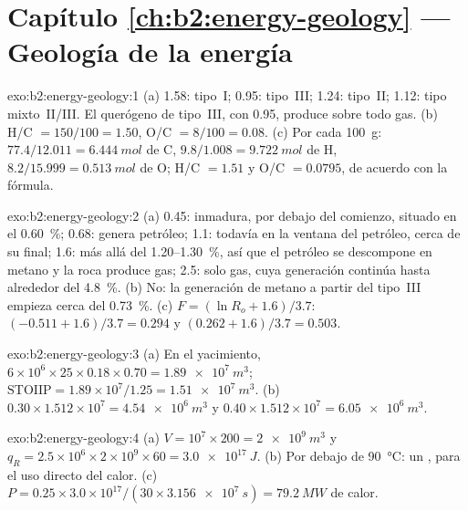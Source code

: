 \section*{Capítulo \ref{ch:b2:energy-geology} --- Geología de la energía}

\begin{solution}{exo:b2:energy-geology:1}
(a) 1.58: tipo~I; 0.95: tipo~III; 1.24: tipo~II; 1.12: tipo mixto~II/III. El querógeno de tipo~III, con
0.95, produce sobre todo gas. (b) H/C $= 150/100 = 1.50$, O/C $= 8/100 = 0.08$. (c) Por cada \qty{100}{g}:
$77.4/12.011 = \qty{6.444}{mol}$ de C, $9.8/1.008 = \qty{9.722}{mol}$ de H, $8.2/15.999 =
\qty{0.513}{mol}$ de O; H/C $= 1.51$ y O/C $= 0.0795$, de acuerdo con la fórmula.
\end{solution}

\begin{solution}{exo:b2:energy-geology:2}
(a) 0.45: inmadura, por debajo del comienzo, situado en el \qty{0.60}{\percent}; 0.68: genera petróleo; 1.1: todavía en la
ventana del petróleo, cerca de su final; 1.6: más allá del 1.20--\qty{1.30}{\percent}, así que el petróleo se descompone en metano y la
roca produce gas; 2.5: solo gas, cuya generación continúa hasta alrededor del \qty{4.8}{\percent}. (b) No: la generación de metano
a partir del tipo~III empieza cerca del \qty{0.73}{\percent}. (c) $F = (\ln R_o + 1.6)/3.7$: $(-0.511 +
1.6)/3.7 = 0.294$ y $(0.262 + 1.6)/3.7 = 0.503$.
\end{solution}

\begin{solution}{exo:b2:energy-geology:3}
(a) En el yacimiento, $6 \times 10^6 \times 25 \times 0.18 \times 0.70 = \qty{1.89e7}{m^3}$;
$\mathrm{STOIIP} = 1.89 \times 10^7/1.25 = \qty{1.51e7}{m^3}$. (b) $0.30 \times 1.512 \times 10^7 =
\qty{4.54e6}{m^3}$ y $0.40 \times 1.512 \times 10^7 = \qty{6.05e6}{m^3}$.
\end{solution}

\begin{solution}{exo:b2:energy-geology:4}
(a) $V = 10^7 \times 200 = \qty{2e9}{m^3}$ y $q_R = 2.5 \times 10^6 \times 2 \times 10^9 \times 60
= \qty{3.0e17}{J}$. (b) Por debajo de \qty{90}{\celsius}: un , para el uso directo del
calor. (c) $P = 0.25 \times 3.0 \times 10^{17}/(30 \times \qty{3.156e7}{s}) = \qty{79.2}{MW}$ de calor.
\end{solution}

